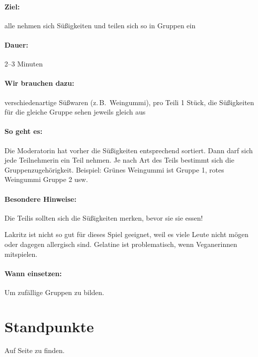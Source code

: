 \paragraph{Ziel:} alle nehmen sich Süßigkeiten und teilen sich so in Gruppen ein
\paragraph{Dauer:} 2--3 Minuten
\paragraph{Wir brauchen dazu:} verschiedenartige Süßwaren (z.\,B.~Weingummi), pro Teili 1 Stück, die Süßigkeiten für die gleiche Gruppe sehen jeweils gleich aus
\paragraph{So geht es:} Die Moderatorin hat vorher die Süßigkeiten entsprechend sortiert. Dann darf sich jede Teilnehmerin ein Teil nehmen. Je nach Art des Teils bestimmt sich die Gruppenzugehörigkeit. Beispiel: Grünes Weingummi ist Gruppe 1, rotes Weingummi Gruppe 2 usw.
\paragraph{Besondere Hinweise:} Die Teilis sollten sich die Süßigkeiten merken, bevor sie sie essen!

Lakritz ist nicht so gut für dieses Spiel geeignet, weil es viele Leute nicht mögen oder dagegen allergisch sind. Gelatine ist problematisch, wenn Veganerinnen mitspielen.
\paragraph{Wann einsetzen:} Um zufällige Gruppen zu bilden.

\section{Standpunkte}
Auf Seite \pageref{standpunkte} zu finden.

